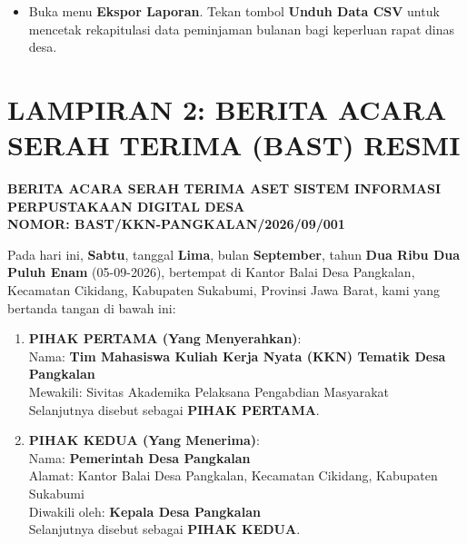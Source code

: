 \documentclass[
  indonesian,
  12pt,
]{report}
\providecommand{\tightlist}{%
  \setlength{\itemsep}{0pt}\setlength{\parskip}{0pt}}
\begin{document}
\begin{enumerate}
  \begin{itemize}
  \tightlist
  \item
    Buka menu \textbf{Ekspor Laporan}. Tekan tombol \textbf{Unduh Data
    CSV} untuk mencetak rekapitulasi data peminjaman bulanan bagi
    keperluan rapat dinas desa.
  \end{itemize}
\end{enumerate}

\newpage

\chapter*{LAMPIRAN 2: BERITA ACARA SERAH TERIMA (BAST)
RESMI}\label{lampiran-2-berita-acara-serah-terima-bast-resmi}

\textbf{BERITA ACARA SERAH TERIMA ASET SISTEM INFORMASI PERPUSTAKAAN
DIGITAL DESA}\\
\textbf{NOMOR: BAST/KKN-PANGKALAN/2026/09/001}

Pada hari ini, \textbf{Sabtu}, tanggal \textbf{Lima}, bulan
\textbf{September}, tahun \textbf{Dua Ribu Dua Puluh Enam} (05-09-2026),
bertempat di Kantor Balai Desa Pangkalan, Kecamatan Cikidang, Kabupaten
Sukabumi, Provinsi Jawa Barat, kami yang bertanda tangan di bawah ini:

\begin{enumerate}
\def\labelenumi{\arabic{enumi}.}
\item
  \textbf{PIHAK PERTAMA (Yang Menyerahkan)}:\\
  Nama: \textbf{Tim Mahasiswa Kuliah Kerja Nyata (KKN) Tematik Desa
  Pangkalan}\\
  Mewakili: Sivitas Akademika Pelaksana Pengabdian Masyarakat\\
  Selanjutnya disebut sebagai \textbf{PIHAK PERTAMA}.
\item
  \textbf{PIHAK KEDUA (Yang Menerima)}:\\
  Nama: \textbf{Pemerintah Desa Pangkalan}\\
  Alamat: Kantor Balai Desa Pangkalan, Kecamatan Cikidang, Kabupaten
  Sukabumi\\
  Diwakili oleh: \textbf{Kepala Desa Pangkalan}\\
  Selanjutnya disebut sebagai \textbf{PIHAK KEDUA}.
\end{enumerate}
\end{document}
